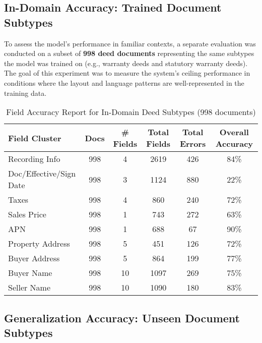 \documentclass{article}
\begin{document}
\subsection{In-Domain Accuracy: Trained Document Subtypes}

To assess the model's performance in familiar contexts, a separate evaluation was conducted on a subset of \textbf{998 deed documents} representing the same subtypes the model was trained on (e.g., warranty deeds and statutory warranty deeds). The goal of this experiment was to measure the system’s ceiling performance in conditions where the layout and language patterns are well-represented in the training data.

\vspace{2mm}

\begin{table}[H]
\centering
\footnotesize
\renewcommand{\arraystretch}{1.2}
\begin{tabular}{|l|c|c|c|c|c|}
\hline
\textbf{Field Cluster} & \textbf{Docs} & \textbf{\# Fields} & \textbf{Total Fields} & \textbf{Total Errors} & \textbf{Overall Accuracy} \\
\hline

Recording Info              & 998 & 4  & 2619 & 426  & 84\% \\
Doc/Effective/Sign Date     & 998 & 3  & 1124 & 880  & 22\% \\
Taxes                       & 998 & 4  & 860  & 240  & 72\% \\
Sales Price                 & 998 & 1  & 743  & 272  & 63\% \\
APN                         & 998 & 1  & 688  & 67   & 90\% \\
Property Address            & 998 & 5  & 451  & 126  & 72\% \\
Buyer Address               & 998 & 5  & 864  & 199  & 77\% \\
Buyer Name                  & 998 & 10 & 1097 & 269  & 75\% \\
Seller Name                 & 998 & 10 & 1090 & 180  & 83\% \\
\hline
\end{tabular}
\caption{Field Accuracy Report for In-Domain Deed Subtypes (998 documents)}
\label{tab:in_domain_accuracy}
\end{table}

\subsection{Generalization Accuracy: Unseen Document Subtypes}
\end{document}
